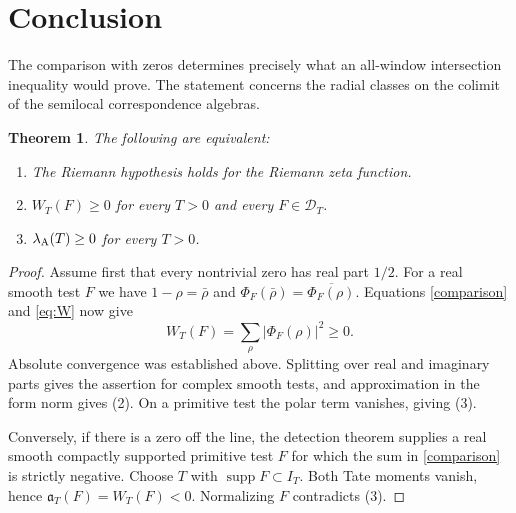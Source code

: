 \documentclass[11pt]{amsart}
\newtheorem{theorem}{Theorem}[section]
\theoremstyle{definition}
\theoremstyle{remark}
\newcommand{\supp}{\operatorname{supp}}
\begin{document}
\section{Conclusion}
The comparison with zeros determines precisely what an all-window
intersection inequality would prove. The statement concerns the radial
classes on the colimit of the semilocal correspondence algebras.

\begin{theorem}
The following are equivalent:
\begin{enumerate}
\item The Riemann hypothesis holds for the Riemann zeta function.
\item $W_T(F)\ge0$ for every $T>0$ and every $F\in\mathcal D_T$.
\item $\lambda_{\rm A}(T)\ge0$ for every $T>0$.
\end{enumerate}
\end{theorem}
\begin{proof}
Assume first that every nontrivial zero has real part $1/2$. For a real
smooth test $F$ we have $1-\rho=\bar\rho$ and
$\Phi_F(\bar\rho)=\overline{\Phi_F(\rho)}$. Equations \eqref{comparison}
and \eqref{eq:W} now give
\[
 W_T(F)=\sum_\rho|\Phi_F(\rho)|^2\ge0.
\]
Absolute convergence was established above. Splitting over real and
imaginary parts gives the assertion for complex smooth tests, and
approximation in the form norm gives (2). On a primitive test the polar
term vanishes, giving (3).

Conversely, if there is a zero off the line, the detection theorem \cite[Theorem~F]{Paper45} supplies a real smooth compactly
supported primitive test $F$ for which the sum in \eqref{comparison} is
strictly negative. Choose $T$ with $\supp F\subset I_T$. Both Tate moments
vanish, hence $\mathfrak a_T(F)=W_T(F)<0$. Normalizing $F$ contradicts (3).
\end{proof}
\end{document}
